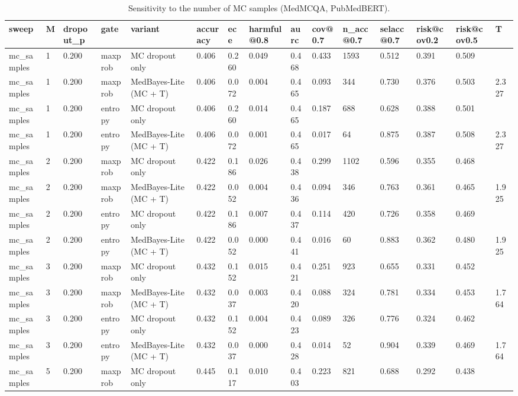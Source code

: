 \begin{table}[htbp]
\centering
\caption{Sensitivity to the number of MC samples (MedMCQA, PubMedBERT).}
\label{tab:rev_S1_mc_samples}
\begin{tabular}{lllllllllllllll}
\toprule
sweep & M & dropout\_p & gate & variant & accuracy & ece & harmful@0.8 & aurc & cov@0.7 & n\_acc@0.7 & selacc@0.7 & risk@cov0.2 & risk@cov0.5 & T \\
\midrule
mc\_samples & 1 & 0.200 & maxprob & MC dropout only & 0.406 & 0.260 & 0.049 & 0.468 & 0.433 & 1593 & 0.512 & 0.391 & 0.509 &  \\
mc\_samples & 1 & 0.200 & maxprob & MedBayes-Lite (MC + T) & 0.406 & 0.072 & 0.004 & 0.465 & 0.093 & 344 & 0.730 & 0.376 & 0.503 & 2.327 \\
mc\_samples & 1 & 0.200 & entropy & MC dropout only & 0.406 & 0.260 & 0.014 & 0.465 & 0.187 & 688 & 0.628 & 0.388 & 0.501 &  \\
mc\_samples & 1 & 0.200 & entropy & MedBayes-Lite (MC + T) & 0.406 & 0.072 & 0.001 & 0.465 & 0.017 & 64 & 0.875 & 0.387 & 0.508 & 2.327 \\
mc\_samples & 2 & 0.200 & maxprob & MC dropout only & 0.422 & 0.186 & 0.026 & 0.438 & 0.299 & 1102 & 0.596 & 0.355 & 0.468 &  \\
mc\_samples & 2 & 0.200 & maxprob & MedBayes-Lite (MC + T) & 0.422 & 0.052 & 0.004 & 0.436 & 0.094 & 346 & 0.763 & 0.361 & 0.465 & 1.925 \\
mc\_samples & 2 & 0.200 & entropy & MC dropout only & 0.422 & 0.186 & 0.007 & 0.437 & 0.114 & 420 & 0.726 & 0.358 & 0.469 &  \\
mc\_samples & 2 & 0.200 & entropy & MedBayes-Lite (MC + T) & 0.422 & 0.052 & 0.000 & 0.441 & 0.016 & 60 & 0.883 & 0.362 & 0.480 & 1.925 \\
mc\_samples & 3 & 0.200 & maxprob & MC dropout only & 0.432 & 0.152 & 0.015 & 0.421 & 0.251 & 923 & 0.655 & 0.331 & 0.452 &  \\
mc\_samples & 3 & 0.200 & maxprob & MedBayes-Lite (MC + T) & 0.432 & 0.037 & 0.003 & 0.420 & 0.088 & 324 & 0.781 & 0.334 & 0.453 & 1.764 \\
mc\_samples & 3 & 0.200 & entropy & MC dropout only & 0.432 & 0.152 & 0.004 & 0.423 & 0.089 & 326 & 0.776 & 0.324 & 0.462 &  \\
mc\_samples & 3 & 0.200 & entropy & MedBayes-Lite (MC + T) & 0.432 & 0.037 & 0.000 & 0.428 & 0.014 & 52 & 0.904 & 0.339 & 0.469 & 1.764 \\
mc\_samples & 5 & 0.200 & maxprob & MC dropout only & 0.445 & 0.117 & 0.010 & 0.403 & 0.223 & 821 & 0.688 & 0.292 & 0.438 &  \\

\end{tabular}
\end{table}
